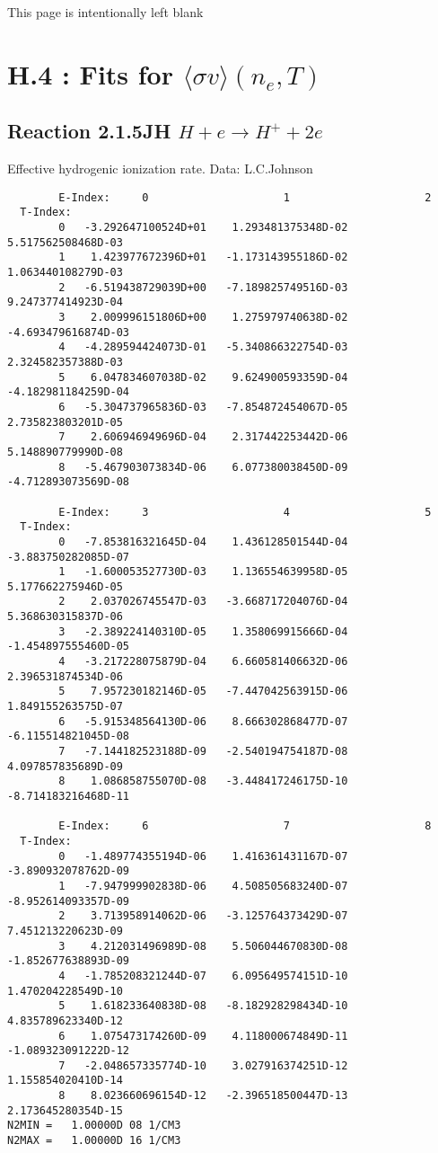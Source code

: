\documentclass[12pt,dvipdfmx]{article}
\begin{document}
\newpage
This page is intentionally left blank
\newpage


\section{H.4 :  Fits for $\langle\sigma v \rangle (n_e,T)$}\label{sect4}

\subsection{
Reaction 2.1.5JH   $H + e \rightarrow H^+ + 2e $}

   Effective hydrogenic ionization rate. Data: L.C.Johnson

\begin{small}\begin{verbatim}
        E-Index:     0                     1                     2
  T-Index:
        0   -3.292647100524D+01    1.293481375348D-02    5.517562508468D-03
        1    1.423977672396D+01   -1.173143955186D-02    1.063440108279D-03
        2   -6.519438729039D+00   -7.189825749516D-03    9.247377414923D-04
        3    2.009996151806D+00    1.275979740638D-02   -4.693479616874D-03
        4   -4.289594424073D-01   -5.340866322754D-03    2.324582357388D-03
        5    6.047834607038D-02    9.624900593359D-04   -4.182981184259D-04
        6   -5.304737965836D-03   -7.854872454067D-05    2.735823803201D-05
        7    2.606946949696D-04    2.317442253442D-06    5.148890779990D-08
        8   -5.467903073834D-06    6.077380038450D-09   -4.712893073569D-08

        E-Index:     3                     4                     5
  T-Index:
        0   -7.853816321645D-04    1.436128501544D-04   -3.883750282085D-07
        1   -1.600053527730D-03    1.136554639958D-05    5.177662275946D-05
        2    2.037026745547D-03   -3.668717204076D-04    5.368630315837D-06
        3   -2.389224140310D-05    1.358069915666D-04   -1.454897555460D-05
        4   -3.217228075879D-04    6.660581406632D-06    2.396531874534D-06
        5    7.957230182146D-05   -7.447042563915D-06    1.849155263575D-07
        6   -5.915348564130D-06    8.666302868477D-07   -6.115514821045D-08
        7   -7.144182523188D-09   -2.540194754187D-08    4.097857835689D-09
        8    1.086858755070D-08   -3.448417246175D-10   -8.714183216468D-11

        E-Index:     6                     7                     8
  T-Index:
        0   -1.489774355194D-06    1.416361431167D-07   -3.890932078762D-09
        1   -7.947999902838D-06    4.508505683240D-07   -8.952614093357D-09
        2    3.713958914062D-06   -3.125764373429D-07    7.451213220623D-09
        3    4.212031496989D-08    5.506044670830D-08   -1.852677638893D-09
        4   -1.785208321244D-07    6.095649574151D-10    1.470204228549D-10
        5    1.618233640838D-08   -8.182928298434D-10    4.835789623340D-12
        6    1.075473174260D-09    4.118000674849D-11   -1.089323091222D-12
        7   -2.048657335774D-10    3.027916374251D-12    1.155854020410D-14
        8    8.023660696154D-12   -2.396518500447D-13    2.173645280354D-15
N2MIN =   1.00000D 08 1/CM3
N2MAX =   1.00000D 16 1/CM3


\end{verbatim}
\end{small}
\end{document}
